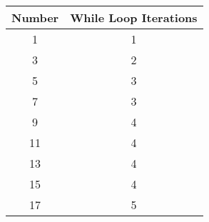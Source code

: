 \begin{center}
    \begin{tabular}{||c c||} 
    \hline
    Number & While Loop Iterations \\ [0.5ex] 
    \hline\hline
    1 & 1 \\ 
    \hline
    3 & 2\\
    \hline
    5 & 3 \\
    \hline
    7 & 3\\
    \hline
    9 & 4 \\ 
    \hline
    11 & 4 \\ 
    \hline
    13 & 4 \\ 
    \hline
    15 & 4 \\ 
    \hline
    17 & 5 \\ 
    \hline
   \end{tabular}
\end{center}